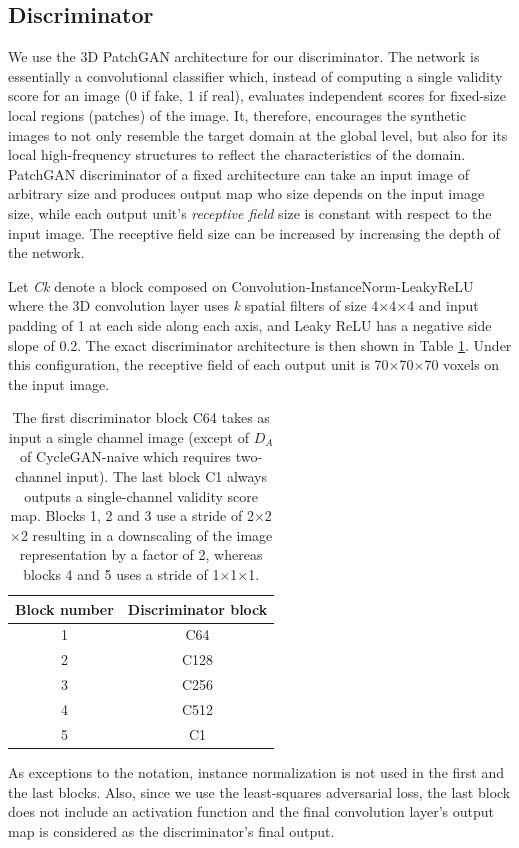 \subsection{Discriminator}
We use the 3D PatchGAN architecture for our discriminator. The network is essentially a convolutional classifier which, instead of computing a single validity score for an image (0 if fake, 1 if real), evaluates independent scores for fixed-size local regions (patches) of the image. It, therefore, encourages the synthetic images to not only resemble the target domain at the global level, but also for its local high-frequency structures to reflect the characteristics of the domain. PatchGAN discriminator of a fixed architecture can take an input image of arbitrary size and produces output map who size depends on the input image size, while each output unit's \textit{receptive field} size is constant with respect to the input image. The receptive field size can be increased by increasing the depth of the network.

Let \textit{Ck} denote a block composed on Convolution-InstanceNorm-LeakyReLU where the 3D convolution layer uses \textit{k} spatial filters of size 4$\times$4$\times$4 and input padding of 1 at each side along each axis, and Leaky ReLU has a negative side slope of 0.2. The exact discriminator architecture is then shown in Table \ref{tab:discriminator_architecture}. Under this configuration, the receptive field of each output unit is 70$\times$70$\times$70 voxels on the input image.


\begin{table}[h!]
    \centering
    \begin{tabular}{|c|c|}
        \hline
        \textbf{Block number} & \textbf{Discriminator block}\\
        \hline
        1     & C64       \\
        \hline
        2     & C128      \\
        \hline
        3     & C256      \\
        \hline 
        4     & C512      \\
        \hline
        5     & C1        \\
        \hline
    \end{tabular}
    \caption{The first discriminator block C64 takes as input a single channel image (except of $D_A$ of CycleGAN-naive which requires two-channel input). The last block C1 always outputs a single-channel validity score map. Blocks 1, 2 and 3 use a stride of 2$\times$2$\times$2 resulting in a downscaling of the image representation by a factor of 2, whereas blocks 4 and 5 uses a stride of 1$\times$1$\times$1.}
    \label{tab:discriminator_architecture}
\end{table}
As exceptions to the notation, instance normalization is not used in the first and the last blocks. Also, since we use the least-squares adversarial loss, the last block does not include an activation function and the final convolution layer's output map is considered as the discriminator's final output.



